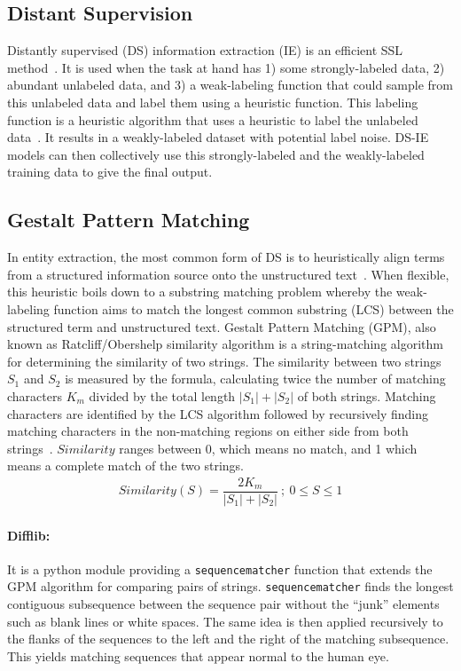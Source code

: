 \documentclass[11pt]{article}
\begin{document}
\subsection{Distant Supervision}
\label{subsec:ds}
%
Distantly supervised (DS) information extraction (IE) is an efficient SSL method~\cite{etzioni2008open,wen2019efficient}.
It is used when the task at hand has 1) some strongly-labeled data, 2) abundant unlabeled data, and 3) a weak-labeling function that could sample from this unlabeled data and label them using a heuristic function.
This labeling function is a heuristic algorithm that uses a heuristic to label the unlabeled data~\cite{pinto2003table, greaves2014relation}.
It results in a weakly-labeled dataset with potential label noise.
DS-IE models can then collectively use this strongly-labeled and the weakly-labeled training data to give the final output.
%
\subsection{Gestalt Pattern Matching}
\label{subsec_gsp}
%
In entity extraction, the most common form of DS is to heuristically align terms from a structured information source onto the unstructured text~\cite{wen2019efficient}.
When flexible, this heuristic boils down to a substring matching problem whereby the weak-labeling function aims to match the longest common substring (LCS) between the structured term and unstructured text.
Gestalt Pattern Matching (GPM), also known as Ratcliff/Obershelp similarity algorithm is a string-matching algorithm for determining the similarity of two strings.
The similarity between two strings $S_{1}$ and $S_{2}$ is measured by the formula, calculating twice the number of matching characters $K_{m}$ divided by the total length $|S_{1}| + |S_{2}|$ of both strings.
Matching characters are identified by the LCS algorithm followed by recursively finding matching characters in the non-matching regions on either side from both strings~\cite{ratcliff1988pattern}.
$Similarity$ ranges between 0, which means no match, and 1 which means a complete match of the two strings.
%
\begin{gather}
  Similarity (S) = \dfrac{ 2 K_{m}}{|S_{1}| + |S_{2}|} \: ; \: 0 \leq	 S \leq	 1
 \end{gather}
%
%
\paragraph{Difflib: }
It is a python module providing a {\tt sequencematcher} function that extends the GPM algorithm for comparing pairs of strings.
{\tt sequencematcher} finds the longest contiguous subsequence between the sequence pair without the ``junk'' elements such as blank lines or white spaces.
The same idea is then applied recursively to the flanks of the sequences to the left and the right of the matching subsequence.
This yields matching sequences that appear normal to the human eye.
%
\end{document}
